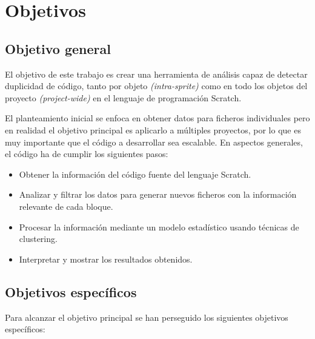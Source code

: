 \documentclass[a4paper, 12pt]{book}
\begin{document}
\cleardoublepage %
\chapter{Objetivos} %
\label{chap:objetivos} %

\section{Objetivo general} %
\label{sec:objetivo-general} %

El objetivo de este trabajo es crear una herramienta de análisis capaz de detectar duplicidad de código, tanto por objeto \textit{(intra-sprite)} como en todo los objetos del proyecto \textit{(project-wide)} en el lenguaje de programación Scratch.

El planteamiento inicial se enfoca en obtener datos para ficheros individuales pero en realidad el objetivo principal es aplicarlo a múltiples proyectos, por lo que es muy importante que el código a desarrollar sea escalable. En aspectos generales, el código ha de cumplir los siguientes pasos:

\begin{itemize}
  \item Obtener la información del código fuente del lenguaje Scratch.
  \item Analizar y filtrar los datos para generar nuevos ficheros con la información relevante de cada bloque.
  \item Procesar la información mediante un modelo estadístico usando técnicas de clustering.
  \item Interpretar y mostrar los resultados obtenidos.
\end{itemize}


\section{Objetivos específicos}
\label{sec:objetivos-especificos}

Para alcanzar el objetivo principal se han perseguido los siguientes objetivos específicos:

\end{document}
